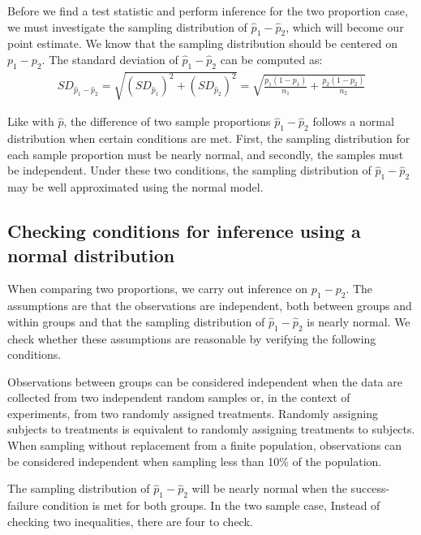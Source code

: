 Before we find a test statistic and perform inference for the two proportion case, we must investigate the sampling distribution of $\hat{p}_1-\hat{p}_2$, which will become our point estimate.  We know that the sampling distribution should be centered on $p_1-p_2$.  The standard deviation of $\hat{p}_1-\hat{p}_2$ can be computed as:
\begin{align*}
SD_{\hat{p}_1 - \hat{p}_2}
	= \sqrt{(SD_{\hat{p}_1})^2 + (SD_{\hat{p}_2})^2} 
	= \sqrt{\frac{p_1(1-p_1)}{n_1} + \frac{p_2(1-p_2)}{n_2}}
\end{align*}

Like with $\hat{p}$, the difference of two sample proportions $\hat{p}_1-\hat{p}_2$ follows a normal distribution when certain conditions are met.  First, the sampling distribution for each sample proportion must be nearly normal, and secondly, the samples must be independent. Under these two conditions, the sampling distribution of $\hat{p}_1 - \hat{p}_2$ may be well approximated using the normal model.


\subsection{Checking conditions for inference using a normal distribution}
When comparing two proportions, we carry out inference on $p_1-p_2$.  The assumptions are that the observations are independent, both between groups and within groups and that the sampling distribution of $\hat{p}_1-\hat{p}_2$ is nearly normal.  We check whether these assumptions are reasonable by verifying the following conditions.
\begin{description}
\setlength{\itemsep}{0mm}
\item[Independent.] Observations between groups can be considered independent when the data are collected from two independent random samples or, in the context of experiments, from two randomly assigned treatments.  Randomly assigning subjects to treatments is equivalent to randomly assigning treatments to subjects.  When sampling without replacement from a finite population, observations can be considered independent when sampling less than 10\% of the population.
\item[Nearly normal sampling distribution.] The sampling distribution of $\hat{p}_1-\hat{p}_2$ will be nearly normal when the success-failure condition is met for both groups.  In the two sample case, Instead of checking two inequalities, there are four to check.
\end{description}



